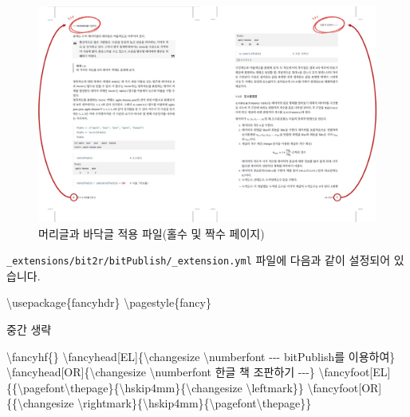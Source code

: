 \documentclass[
  letterpaper,
]{book}
\newenvironment{Shaded}{\begin{snugshade}}{\end{snugshade}}
\newcommand{\BuiltInTok}[1]{\textcolor[rgb]{0.00,0.23,0.31}{#1}}
\newcommand{\ExtensionTok}[1]{\textcolor[rgb]{0.00,0.23,0.31}{#1}}
\newcommand{\FunctionTok}[1]{\textcolor[rgb]{0.28,0.35,0.67}{#1}}
\newcommand{\NormalTok}[1]{\textcolor[rgb]{0.00,0.23,0.31}{#1}}
\begin{document}
\begin{figure}

{\centering \includegraphics{images/footer_header.jpg}

}

\caption{머리글과 바닥글 적용 파일(홀수 및 짝수 페이지)}

\end{figure}

\texttt{\_extensions/bit2r/bitPublish/\_extension.yml} 파일에 다음과
같이 설정되어 있습니다.

\begin{Shaded}
\begin{Highlighting}[]
\BuiltInTok{\textbackslash{}usepackage}\NormalTok{\{}\ExtensionTok{fancyhdr}\NormalTok{\}}
\FunctionTok{\textbackslash{}pagestyle}\NormalTok{\{fancy\}}

\NormalTok{중간 생략}

\FunctionTok{\textbackslash{}fancyhf}\NormalTok{\{\}}
\FunctionTok{\textbackslash{}fancyhead}\NormalTok{[EL]\{}\FunctionTok{\textbackslash{}changesize} \FunctionTok{\textbackslash{}numberfont}\NormalTok{ {-}{-}{-} bitPublish를 이용하여\}}
\FunctionTok{\textbackslash{}fancyhead}\NormalTok{[OR]\{}\FunctionTok{\textbackslash{}changesize} \FunctionTok{\textbackslash{}numberfont}\NormalTok{ 한글 책 조판하기 {-}{-}{-}\}}
\FunctionTok{\textbackslash{}fancyfoot}\NormalTok{[EL]\{\{}\FunctionTok{\textbackslash{}pagefont\textbackslash{}thepage}\NormalTok{\}\{}\FunctionTok{\textbackslash{}hskip}\NormalTok{4mm\}\{}\FunctionTok{\textbackslash{}changesize} \FunctionTok{\textbackslash{}leftmark}\NormalTok{\}\}}
\FunctionTok{\textbackslash{}fancyfoot}\NormalTok{[OR]\{\{}\FunctionTok{\textbackslash{}changesize} \FunctionTok{\textbackslash{}rightmark}\NormalTok{\}\{}\FunctionTok{\textbackslash{}hskip}\NormalTok{4mm\}\{}\FunctionTok{\textbackslash{}pagefont\textbackslash{}thepage}\NormalTok{\}\}}
\end{Highlighting}
\end{Shaded}
\end{document}
